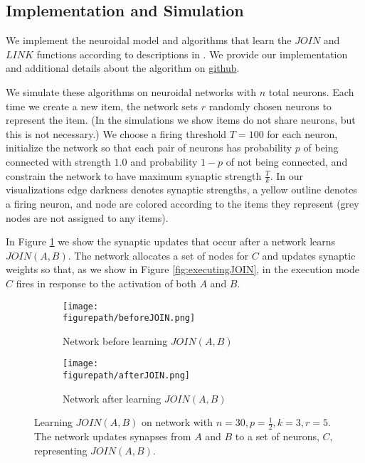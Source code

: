 \documentclass[letterpaper, 12pt]{article}
\newcommand{\figurepath}{../../Figures}
\begin{document}
\subsection{Implementation and Simulation}
We implement the neuroidal model and algorithms that learn the $JOIN$ and $LINK$ functions according to descriptions in \cite{valiant_memorization_2005}. We provide our implementation and additional details about the algorithm on \href{https://github.com/cchen23/neuroidal_model_project/tree/master/Code}{github}.

We simulate these algorithms on neuroidal networks with $n$ total neurons. Each time we create a new item, the network sets $r$ randomly chosen neurons to represent the item. (In the simulations we show items do not share neurons, but this is not necessary.) We choose a firing threshold $T=100$ for each neuron, initialize the network so that each pair of neurons has probability $p$ of being connected with strength $1.0$ and probability $1-p$ of not being connected, and constrain the network to have maximum synaptic strength $\frac{T}{k}$. In our visualizations edge darkness denotes synaptic strengths, a yellow outline denotes a firing neuron, and node are colored according to the items they represent (grey nodes are not assigned to any items).

In Figure \ref{fig:learningJOIN} we show the synaptic updates that occur after a network learns $JOIN(A,B)$. The network allocates a set of nodes for $C$ and updates synaptic weights so that, as we show in Figure \ref{fig:executingJOIN}, in the execution mode $C$ fires in response to the activation of both $A$ and $B$.

\begin{figure}[!htb]
\centering
\begin{subfigure}[b]{0.45\textwidth}
      \texttt{[image: \\figurepath/beforeJOIN.png]}
      \caption*{Network before learning $JOIN(A,B)$}
\end{subfigure}
\begin{subfigure}[b]{0.45\textwidth}
      \texttt{[image: \\figurepath/afterJOIN.png]}
      \caption*{Network after learning $JOIN(A,B)$}
\end{subfigure}
\caption{Learning $JOIN(A,B)$ on network with $n=30,p=\frac{1}{2},k=3,r=5$. The network updates synapses from $A$ and $B$ to a set of neurons, $C$, representing $JOIN(A,B)$.}\label{fig:learningJOIN}
\end{figure}
\end{document}

